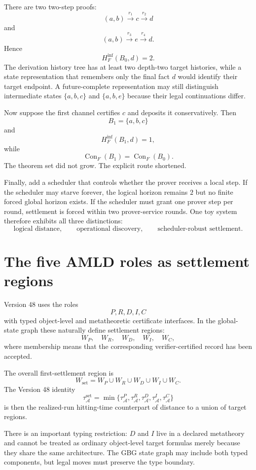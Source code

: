 \documentclass[11pt]{article}
\theoremstyle{remark}
\newcommand{\Con}{\operatorname{Con}}
\begin{document}
There are two two-step proofs:
\[
(a,b)\xrightarrow{r_1}c\xrightarrow{r_2}d
\]
and
\[
(a,b)\xrightarrow{r_3}e\xrightarrow{r_4}d.
\]
Hence
\[
H_F^{\mathrm{inf}}(B_0,d)=2.
\]
The derivation history tree has at least two depth-two target histories, while a state representation that remembers only the final fact $d$ would identify their target endpoint. A future-complete representation may still distinguish intermediate states $\{a,b,c\}$ and $\{a,b,e\}$ because their legal continuations differ.

Now suppose the first channel certifies $c$ and deposits it conservatively. Then
\[
B_1=\{a,b,c\}
\]
and
\[H_F^{\mathrm{inf}}(B_1,d)=1,
\]
while
\[
\Con_F(B_1)=\Con_F(B_0).
\]
The theorem set did not grow. The explicit route shortened.

Finally, add a scheduler that controls whether the prover receives a local step. If the scheduler may starve forever, the logical horizon remains $2$ but no finite forced global horizon exists. If the scheduler must grant one prover step per round, settlement is forced within two prover-service rounds. One toy system therefore exhibits all three distinctions:
\[
\text{logical distance},\qquad
\text{operational discovery},\qquad
\text{scheduler-robust settlement}.
\]

\section{The five AMLD roles as settlement regions}

Version 48 uses the roles
\[
P,R,D,I,C
\]
with typed object-level and metatheoretic certificate interfaces. In the global-state graph these naturally define settlement regions:
\[
W_P,\quad W_R,\quad W_D,\quad W_I,\quad W_C,
\]
where membership means that the corresponding verifier-certified record has been accepted.

The overall first-settlement region is
\[
W_{\mathrm{set}}
=
W_P\cup W_R\cup W_D\cup W_I\cup W_C.
\]
The Version 48 identity
\[
\tau_{\mathcal A}^{\mathrm{set}}
=
\min\{\tau_{\mathcal A}^P,
\tau_{\mathcal A}^R,
\tau_{\mathcal A}^D,
\tau_{\mathcal A}^I,
\tau_{\mathcal A}^C\}
\]
is then the realized-run hitting-time counterpart of distance to a union of target regions.

There is an important typing restriction: $D$ and $I$ live in a declared metatheory and cannot be treated as ordinary object-level target formulas merely because they share the same architecture. The GBG state graph may include both typed components, but legal moves must preserve the type boundary.
\end{document}
